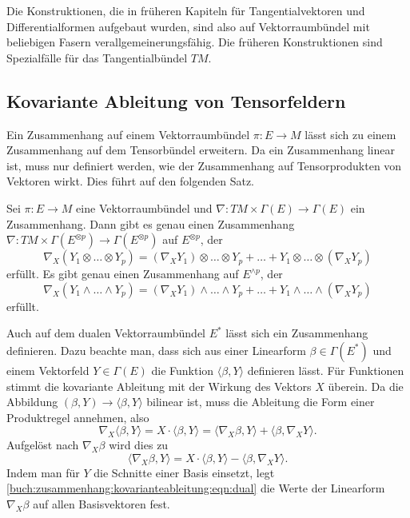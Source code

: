 Die Konstruktionen, die in früheren Kapiteln für Tangentialvektoren
und Differentialformen aufgebaut wurden, sind also auf 
Vektorraumbündel mit beliebigen Fasern verallgemeinerungsfähig.
Die früheren Konstruktionen sind Spezialfälle für das Tangentialbündel
$TM$.

%
%
\subsection{Kovariante Ableitung von Tensorfeldern}
Ein Zusammenhang auf einem Vektorraumbündel $\pi\colon E\to M$ lässt
sich zu einem Zusammenhang auf dem Tensorbündel erweitern.
Da ein Zusammenhang linear ist, muss nur definiert werden, wie
der Zusammenhang auf Tensorprodukten von Vektoren wirkt.
Dies führt auf den folgenden Satz.

\begin{satz}
Sei $\pi\colon E\to M$ eine Vektorraumbündel und 
$\nabla \colon TM\times \Gamma(E)\to\Gamma(E)$
ein Zusammenhang.
Dann gibt es genau einen Zusammenhang
$\nabla \colon TM \times \Gamma(E^{\otimes p})\to\Gamma(E^{\otimes p})$
auf $E^{\otimes p}$, der
\[
\nabla_X(Y_1\otimes\dots\otimes Y_p)
=
(\nabla_XY_1) \otimes\dots\otimes Y_p
+
\dots
+
Y_1\otimes\dots\otimes (\nabla_XY_p)
\]
erfüllt.
Es gibt genau einen Zusammenhang auf $E^{\wedge p}$, der
\[
\nabla_X(Y_1\wedge\dots\wedge Y_p)
=
(\nabla_XY_1)\wedge\dots\wedge Y_p
+
\dots
+
Y_1\wedge\dots\wedge(\nabla_XY_p)
\]
erfüllt.
\end{satz}

Auch auf dem dualen Vektorraumbündel $E^*$ lässt sich ein Zusammenhang
definieren.
Dazu beachte man, dass sich aus einer Linearform $\beta\in\Gamma(E^*)$
und einem Vektorfeld $Y\in \Gamma(E)$ die Funktion
$\langle\beta,Y\rangle$ definieren lässt.
Für Funktionen stimmt die kovariante Ableitung mit der Wirkung des
Vektors $X$ überein.
Da die Abbildung $(\beta,Y)\to\langle\beta,Y\rangle$ bilinear ist,
muss die Ableitung die Form einer Produktregel annehmen, also
\[
\nabla_X\langle \beta,Y\rangle
=
X\cdot \langle \beta,Y\rangle
=
\langle \nabla_X\beta,Y\rangle
+
\langle \beta,\nabla_X Y\rangle.
\]
Aufgelöst nach $\nabla_X\beta$ wird dies zu
\begin{equation}
\langle \nabla_X\beta,Y\rangle
=
X\cdot \langle \beta,Y\rangle
-
\langle \beta,\nabla_X Y\rangle.
\label{buch:zusammenhang:kovarianteableitung:eqn:dual}
\end{equation}
Indem man für $Y$ die Schnitte einer Basis einsetzt, 
legt
\eqref{buch:zusammenhang:kovarianteableitung:eqn:dual}
die Werte der Linearform $\nabla_X\beta$ auf allen Basisvektoren
fest.

